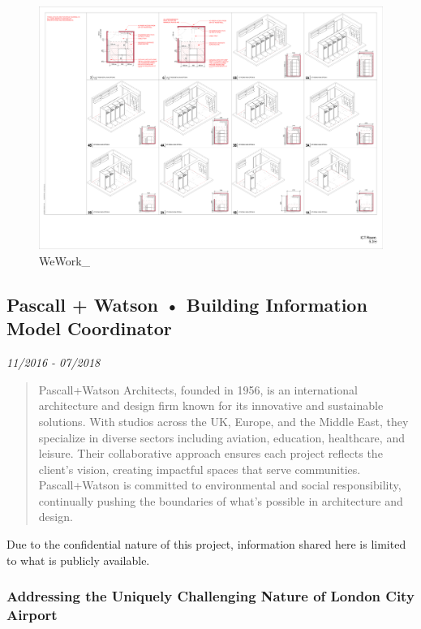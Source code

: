 \documentclass[
]{article}
\begin{document}
\begin{figure}[H]

{\centering \includegraphics{assets/WeWork/ww_design_standards-30.png}

}

\caption{WeWork\_}

\end{figure}%

\subsection{Pascall + Watson • Building Information Model
Coordinator}\label{pascall-watson-building-information-model-coordinator}

\emph{11/2016 - 07/2018}

\begin{quote}
Pascall+Watson Architects, founded in 1956, is an international
architecture and design firm known for its innovative and sustainable
solutions. With studios across the UK, Europe, and the Middle East, they
specialize in diverse sectors including aviation, education, healthcare,
and leisure. Their collaborative approach ensures each project reflects
the client's vision, creating impactful spaces that serve communities.
Pascall+Watson is committed to environmental and social responsibility,
continually pushing the boundaries of what's possible in architecture
and design.
\end{quote}

Due to the confidential nature of this project, information shared here
is limited to what is publicly available.

\subsubsection{Addressing the Uniquely Challenging Nature of London City
Airport}\label{addressing-the-uniquely-challenging-nature-of-london-city-airport}
\end{document}
